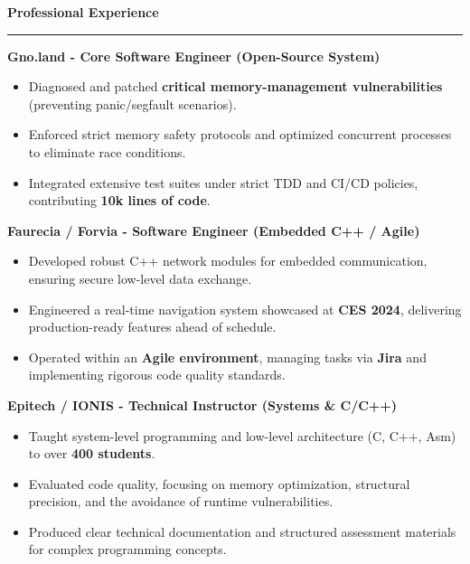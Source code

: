 \documentclass[9pt]{extarticle}
\begin{document}
\par\vspace{5pt}

{\large\bfseries Professional Experience}
\par\vspace{-8pt}
\rule{\linewidth}{0.4pt}
\par\vspace{5pt}

{\bfseries Gno.land - Core Software Engineer (Open-Source System)}
\begin{itemize}[noitemsep, topsep=0pt]
    \item Diagnosed and patched {\bfseries critical memory-management vulnerabilities} (preventing panic/segfault scenarios).
    \item Enforced strict memory safety protocols and optimized concurrent processes to eliminate race conditions.
    \item Integrated extensive test suites under strict TDD and CI/CD policies, contributing {\bfseries 10k lines of code}.
\end{itemize}

\par\vspace{5pt}

{\bfseries Faurecia / Forvia - Software Engineer (Embedded C++ / Agile)}
\begin{itemize}[noitemsep, topsep=0pt]
    \item Developed robust C++ network modules for embedded communication, ensuring secure low-level data exchange.
    \item Engineered a real-time navigation system showcased at {\bfseries CES 2024}, delivering production-ready features ahead of schedule.
    \item Operated within an {\bfseries Agile environment}, managing tasks via {\bfseries Jira} and implementing rigorous code quality standards.
\end{itemize}

\par\vspace{5pt}

{\bfseries Epitech / IONIS - Technical Instructor (Systems \& C/C++)}
\begin{itemize}[noitemsep, topsep=0pt]
    \item Taught system-level programming and low-level architecture (C, C++, Asm) to over {\bfseries 400 students}.
    \item Evaluated code quality, focusing on memory optimization, structural precision, and the avoidance of runtime vulnerabilities.
    \item Produced clear technical documentation and structured assessment materials for complex programming concepts.
\end{itemize}
\end{document}
